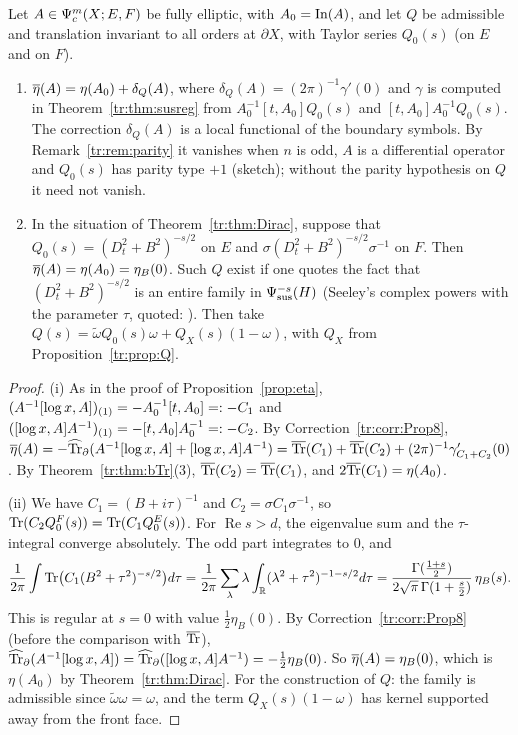 \begin{proposition}\label{tr:prop:etabar}
Let \(A\in\Psi_{c}^m(X;E,F)\) be fully elliptic, with \(A_0=\operatorname{In}(A)\), and let
\(Q\) be admissible and translation invariant to all orders at
\(\partial X\), with Taylor series \(Q_0(s)\) (on \(E\) and on \(F\)).
\begin{enumerate}\renewcommand{\labelenumi}{(\roman{enumi})}
\item \(\overline\eta(A)=\eta(A_0)+\delta_Q(A)\), where
\(\delta_Q(A)=(2\pi)^{-1}\gamma'(0)\) and \(\gamma\) is computed in
Theorem~\ref{tr:thm:susreg} from \(A_0^{-1}[t,A_0]Q_0(s)\) and
\([t,A_0]A_0^{-1}Q_0(s)\). The correction \(\delta_Q(A)\) is a local
functional of the boundary symbols. By Remark~\ref{tr:rem:parity} it
vanishes when \(n\) is odd, \(A\) is a differential operator and
\(Q_0(s)\) has parity type \(+1\) (sketch); without the parity hypothesis
on \(Q\) it need not vanish.
\item In the situation of Theorem~\ref{tr:thm:Dirac}, suppose that
\(Q_0(s)=(D_t^2+B^2)^{-s/2}\) on \(E\) and
\(\sigma(D_t^2+B^2)^{-s/2}\sigma^{-1}\) on \(F\). Then
\(\overline\eta(A)=\eta(A_0)=\eta_B(0)\). Such \(Q\) exist if one quotes the fact
that \((D_t^2+B^2)^{-s/2}\) is an entire family in \(\Psi_{\mathrm{sus}}^{-s}(H)\)
(Seeley's complex powers \cite{Seeley} with the parameter \(\tau\),
quoted: \cite[App.~B]{MN}). Then take
\(Q(s)=\tilde\omega Q_0(s)\omega+Q_X(s)(1-\omega)\), with \(Q_X\) from
Proposition~\ref{tr:prop:Q}.
\end{enumerate}
\end{proposition}

\begin{proof}
(i) As in the proof of Proposition~\ref{prop:eta},
\((A^{-1}[\log x,A])_{(1)}=-A_0^{-1}[t,A_0]=:-C_1\) and
\(([\log x,A]A^{-1})_{(1)}=-[t,A_0]A_0^{-1}=:-C_2\). By
Correction~\ref{tr:corr:Prop8}, \(\overline\eta(A)=-\widehat{\operatorname{Tr}}_\partial(A^{-1}[\log x,A]+[\log x,A]
A^{-1})=\overline{\operatorname{Tr}}(C_1)+\overline{\operatorname{Tr}}(C_2)+(2\pi)^{-1}\gamma'_{C_1+C_2}(0)\). By
Theorem~\ref{tr:thm:bTr}(3), \(\overline{\operatorname{Tr}}(C_2)=\overline{\operatorname{Tr}}(C_1)\), and
\(2\overline{\operatorname{Tr}}(C_1)=\eta(A_0)\).

(ii) We have \(C_1=(B+i\tau)^{-1}\) and \(C_2=\sigma C_1\sigma^{-1}\), so
\(\operatorname{Tr}(C_2Q_0^F(s))=\operatorname{Tr}(C_1Q_0^E(s))\). For \(\operatorname{Re}s>d\), the
eigenvalue sum and the \(\tau\)-integral converge absolutely. The odd part
integrates to \(0\), and
\[
 \frac1{2\pi}\int\operatorname{Tr}\bigl(C_1(B^2+\tau^2)^{-s/2}\bigr)d\tau=\frac1{2\pi}
 \sum_\lambda\lambda\int_\mathbb R(\lambda^2+\tau^2)^{-1-s/2}d\tau=
 \frac{\Gamma(\frac{1+s}2)}{2\sqrt\pi\,\Gamma(1+\frac s2)}\,\eta_B(s).
\]
This is regular at \(s=0\) with value \(\frac12\eta_B(0)\). By
Correction~\ref{tr:corr:Prop8} (before the comparison with \(\overline{\operatorname{Tr}}\)),
\(\widehat{\operatorname{Tr}}_\partial(A^{-1}[\log x,A])=\widehat{\operatorname{Tr}}_\partial([\log x,A]A^{-1})=-\frac12\eta_B(0)\). So
\(\overline\eta(A)=\eta_B(0)\), which is \(\eta(A_0)\) by
Theorem~\ref{tr:thm:Dirac}. For the construction of \(Q\): the family is
admissible since \(\tilde\omega\omega=\omega\), and the term
\(Q_X(s)(1-\omega)\) has kernel supported away from the front face.
\end{proof}

